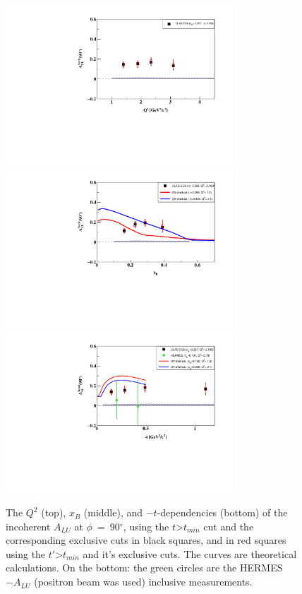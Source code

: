 \begin{figure}[h!]
   \centering
   \includegraphics[height=6.0cm]{fig-incoh/ALU_90_p_vs_Q2_shortscenrario.pdf}\\
   \includegraphics[height=6.0cm]{fig-incoh/ALU_90_p_vs_x_shortscenrario.pdf}\\
   \includegraphics[height=6.0cm]{fig-incoh/ALU_90_p_vs_t_shortscenrario.pdf}
   \caption{The $Q^{2}$ (top), $x_{B}$ (middle), and $-t$-dependencies (bottom) 
      of the incoherent $A_{LU}$ at $\phi$~=~90$^{\circ}$, using the 
   $t$>$t_{min}$ cut and the corresponding exclusive cuts in black squares, and 
in red squares using the $t'$>$t_{min}$ and it's exclusive cuts.  The curves 
are theoretical calculations. On the bottom: the green circles are the HERMES 
$-A_{LU}$ (positron beam was used) inclusive measurements.}
\label{fig:incoh_Q2_xB_t_ALU}
\end{figure}



